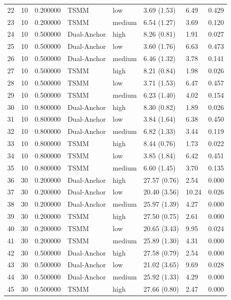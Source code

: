 \begin{tabular}{lrrlllll}
22 & 10 & 0.200000 & TSMM & low & 3.69 (1.53) & 6.49 & 0.429 \\
23 & 10 & 0.200000 & TSMM & medium & 6.54 (1.27) & 3.69 & 0.120 \\
24 & 10 & 0.500000 & Dual-Anchor & high & 8.26 (0.81) & 1.91 & 0.027 \\
25 & 10 & 0.500000 & Dual-Anchor & low & 3.60 (1.76) & 6.63 & 0.473 \\
26 & 10 & 0.500000 & Dual-Anchor & medium & 6.46 (1.32) & 3.78 & 0.141 \\
27 & 10 & 0.500000 & TSMM & high & 8.21 (0.84) & 1.98 & 0.026 \\
28 & 10 & 0.500000 & TSMM & low & 3.71 (1.53) & 6.47 & 0.457 \\
29 & 10 & 0.500000 & TSMM & medium & 6.23 (1.40) & 4.02 & 0.154 \\
30 & 10 & 0.800000 & Dual-Anchor & high & 8.30 (0.82) & 1.89 & 0.026 \\
31 & 10 & 0.800000 & Dual-Anchor & low & 3.84 (1.64) & 6.38 & 0.450 \\
32 & 10 & 0.800000 & Dual-Anchor & medium & 6.82 (1.33) & 3.44 & 0.119 \\
33 & 10 & 0.800000 & TSMM & high & 8.44 (0.76) & 1.73 & 0.022 \\
34 & 10 & 0.800000 & TSMM & low & 3.85 (1.84) & 6.42 & 0.451 \\
35 & 10 & 0.800000 & TSMM & medium & 6.60 (1.45) & 3.70 & 0.135 \\
36 & 30 & 0.200000 & Dual-Anchor & high & 27.57 (0.76) & 2.54 & 0.000 \\
37 & 30 & 0.200000 & Dual-Anchor & low & 20.40 (3.56) & 10.24 & 0.026 \\
38 & 30 & 0.200000 & Dual-Anchor & medium & 25.97 (1.39) & 4.27 & 0.000 \\
39 & 30 & 0.200000 & TSMM & high & 27.50 (0.75) & 2.61 & 0.000 \\
40 & 30 & 0.200000 & TSMM & low & 20.65 (3.43) & 9.95 & 0.024 \\
41 & 30 & 0.200000 & TSMM & medium & 25.89 (1.30) & 4.31 & 0.000 \\
42 & 30 & 0.500000 & Dual-Anchor & high & 27.58 (0.79) & 2.54 & 0.000 \\
43 & 30 & 0.500000 & Dual-Anchor & low & 21.02 (3.65) & 9.69 & 0.028 \\
44 & 30 & 0.500000 & Dual-Anchor & medium & 25.92 (1.33) & 4.29 & 0.000 \\
45 & 30 & 0.500000 & TSMM & high & 27.66 (0.80) & 2.47 & 0.000 \\

\end{tabular}
